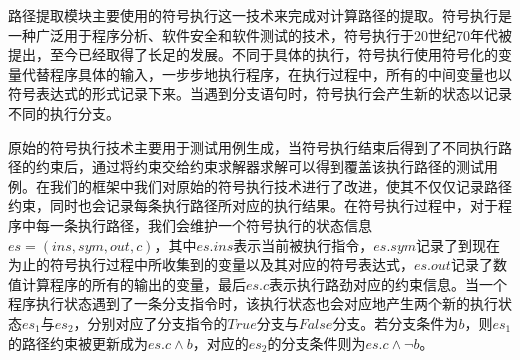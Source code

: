 路径提取模块主要使用的符号执行这一技术来完成对计算路径的提取。符号执行是一种广泛用于程序分析、软件安全和软件测试的技术，符号执行于20世纪70年代被提出，至今已经取得了长足的发展。不同于具体的执行，符号执行使用符号化的变量代替程序具体的输入，一步步地执行程序，在执行过程中，所有的中间变量也以符号表达式的形式记录下来。当遇到分支语句时，符号执行会产生新的状态以记录不同的执行分支。

原始的符号执行技术主要用于测试用例生成，当符号执行结束后得到了不同执行路径的约束后，通过将约束交给约束求解器求解可以得到覆盖该执行路径的测试用例。在我们的框架中我们对原始的符号执行技术进行了改进，使其不仅仅记录路径约束，同时也会记录每条执行路径所对应的执行结果。在符号执行过程中，对于程序中每一条执行路径，我们会维护一个符号执行的状态信息$es=(ins, sym, out, c)$，其中$es.ins$表示当前被执行指令，$es.sym$记录了到现在为止的符号执行过程中所收集到的变量以及其对应的符号表达式，$es.out$记录了数值计算程序的所有的输出的变量，最后$es.c$表示执行路劲对应的约束信息。当一个程序执行状态遇到了一条分支指令时，该执行状态也会对应地产生两个新的执行状态$es_1$与$es_2$，分别对应了分支指令的$True$分支与$False$分支。若分支条件为$b$，则$es_1$的路径约束被更新成为$es.c \wedge b$，对应的$es_2$的分支条件则为$es.c \wedge \neg b$。

